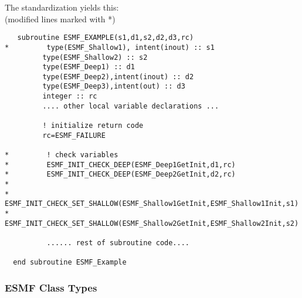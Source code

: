 The standardization yields this:\\
(modified lines marked with *)

\begin{verbatim}
   subroutine ESMF_EXAMPLE(s1,d1,s2,d2,d3,rc)
*         type(ESMF_Shallow1), intent(inout) :: s1
         type(ESMF_Shallow2) :: s2
         type(ESMF_Deep1) :: d1
         type(ESMF_Deep2),intent(inout) :: d2
         type(ESMF_Deep3),intent(out) :: d3
         integer :: rc
         .... other local variable declarations ...

         ! initialize return code
         rc=ESMF_FAILURE

*         ! check variables
*         ESMF_INIT_CHECK_DEEP(ESMF_Deep1GetInit,d1,rc)
*         ESMF_INIT_CHECK_DEEP(ESMF_Deep2GetInit,d2,rc)
*
*         ESMF_INIT_CHECK_SET_SHALLOW(ESMF_Shallow1GetInit,ESMF_Shallow1Init,s1)
*         ESMF_INIT_CHECK_SET_SHALLOW(ESMF_Shallow2GetInit,ESMF_Shallow2Init,s2)

          ...... rest of subroutine code....

  end subroutine ESMF_Example
\end{verbatim}

\subsubsection{ESMF Class Types}\label{is:typelist}

